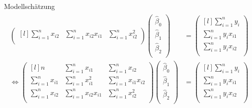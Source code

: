 \documentclass[
  8pt,
  ignorenonframetext,
]{beamer}
\begin{document}
\begin{frame}{Modellschätzung}
\begin{align*}
\begin{split}
\begin{pmatrix*}[l]
\sum_{i=1}^n x_{i2} & \sum_{i=1}^n x_{i2}x_{i1} & \sum_{i=1}^n x_{i2}^2       \\
\end{pmatrix*}
\begin{pmatrix}
\hat{\beta}_0 \\
\hat{\beta}_1 \\
\hat{\beta}_2 \\
\end{pmatrix}
& =
\begin{pmatrix*}[l]
\sum_{i=1}^n y_i \\
\sum_{i=1}^n y_ix_{i1} \\
\sum_{i=1}^n y_ix_{i2} \\
\end{pmatrix*}
\\\Leftrightarrow
\begin{pmatrix*}[l]
n                   & \sum_{i=1}^n x_{i1}       & \sum_{i=1}^n x_{i2}       \\
\sum_{i=1}^n x_{i1} & \sum_{i=1}^n x_{i1}^2     & \sum_{i=1}^n x_{i1}x_{i2} \\
\sum_{i=1}^n x_{i2} & \sum_{i=1}^n x_{i2}x_{i1} & \sum_{i=1}^n x_{i2}^2       \\
\end{pmatrix*}
\begin{pmatrix}
\hat{\beta}_0 \\
\hat{\beta}_1 \\
\hat{\beta}_2 \\
\end{pmatrix}
& =
\begin{pmatrix*}[l]
\sum_{i=1}^n y_i \\
\sum_{i=1}^n y_ix_{i1} \\
\sum_{i=1}^n y_ix_{i2} \\
\end{pmatrix*}
\end{split}
\end{align*}
\end{frame}
\end{document}
